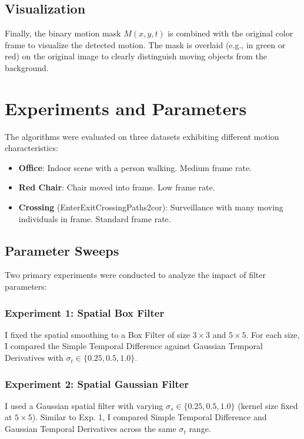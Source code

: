 \documentclass[11pt, twocolumn]{article}
\begin{document}
\subsection{Visualization}
Finally, the binary motion mask $M(x, y, t)$ is combined with the original color frame to visualize the detected motion. The mask is overlaid (e.g., in green or red) on the original image to clearly distinguish moving objects from the background.

\section{Experiments and Parameters}
The algorithms were evaluated on three datasets exhibiting different motion characteristics:
\begin{itemize}
    \item \textbf{Office}: Indoor scene with a person walking. Medium frame rate.
    \item \textbf{Red Chair}: Chair moved into frame. Low frame rate.
    \item \textbf{Crossing} (EnterExitCrossingPaths2cor): Surveillance with many moving individuals in frame. Standard frame rate.
\end{itemize}

\subsection{Parameter Sweeps}
Two primary experiments were conducted to analyze the impact of filter parameters:

\subsubsection{Experiment 1: Spatial Box Filter}
I fixed the spatial smoothing to a Box Filter of size $3 \times 3$ and $5 \times 5$. For each size, I compared the Simple Temporal Difference against Gaussian Temporal Derivatives with $\sigma_t \in \{0.25, 0.5, 1.0\}$.

\subsubsection{Experiment 2: Spatial Gaussian Filter}
I used a Gaussian spatial filter with varying $\sigma_s \in \{0.25, 0.5, 1.0\}$ (kernel size fixed at $5 \times 5$). Similar to Exp. 1, I compared Simple Temporal Difference and Gaussian Temporal Derivatives across the same $\sigma_t$ range.
\end{document}
